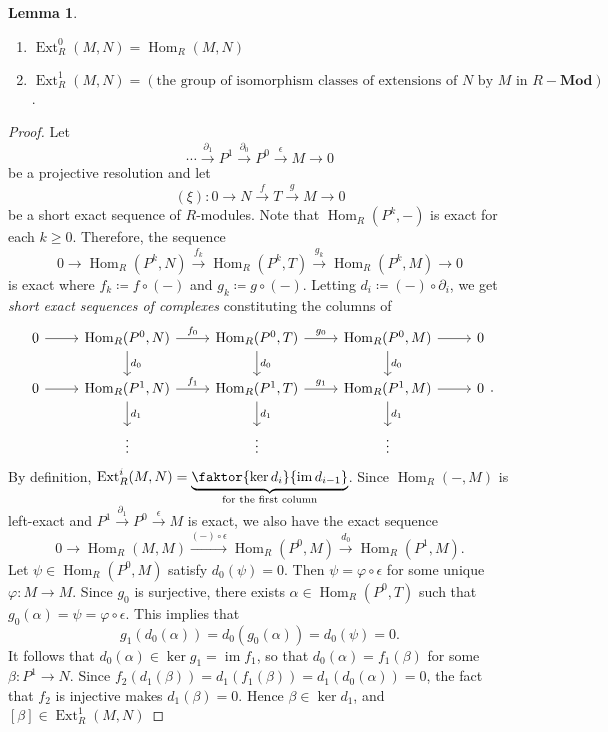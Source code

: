 \documentclass[10pt,letterpaper,cm]{nupset}
\theoremstyle{definition}
\theoremstyle{theorem}
\newtheorem{lemma}[definition]{Lemma}
\theoremstyle{remark}
\newcommand{\1}{\mathbf{1}}
\newcommand{\0}{\vec 0}
\DeclareMathOperator{\ext}{Ext}
\DeclareMathOperator{\im}{im}
\DeclareMathOperator{\Hom}{Hom}
\begin{document}
\begin{lemma} $ $
\begin{enumerate}
\item $\ext^0_R(M, N) = \Hom_R(M, N)$
\item $\ext^1_R(M, N) = \left( \text{the group of isomorphism classes of extensions of } N \text{ by } M\text{ in } R{-}\mathbf{Mod}    \right)$.
\end{enumerate}                                                                                                \end{lemma}
\begin{proof}
Let $$\cdots \overset{\partial_1}{\longrightarrow} P^1 \overset{\partial_0}{\longrightarrow} P^0  \overset{\epsilon}{\longrightarrow} M \to 0$$ be a projective resolution and
let $$(\xi) : 0 \to N \overset{f}{\longrightarrow} T \overset{g}{\longrightarrow} M \to 0$$ be a short exact sequence of $R$-modules.
Note that $\Hom_R(P^k, -)$ is exact for each $k\geq 0$. Therefore, the sequence $$ 0 \to \Hom_R(P^k, N) \overset{f_k}{\longrightarrow} \Hom_R(P^k, T) \overset{g_k}{\longrightarrow} \Hom_R(P^k, M) \to 0   $$ is exact where $f_k \coloneqq  f\circ (-)$ and $g_k \coloneqq  g \circ (-)$. Letting $d_i \coloneqq  (-)\circ \partial_i$, we get \textit{short exact sequences of complexes} constituting the columns of 
\[
\begin{tikzcd}
0 \arrow[r] & {\Hom_R(P^0, N)} \arrow[r, "f_0"] \arrow[d, "d_0"] & {\Hom_R(P^0, T)} \arrow[r, "g_0"] \arrow[d, "d_0"] & {\Hom_R(P^0, M)} \arrow[r] \arrow[d, "d_0"] & 0 \\
0 \arrow[r] & {\Hom_R(P^1, N)} \arrow[r, "f_1"] \arrow[d, "d_1"] & {\Hom_R(P^1, T)} \arrow[r, "g_1"] \arrow[d, "d_1"] & {\Hom_R(P^1, M)} \arrow[r] \arrow[d, "d_1"] & 0 \\
 & \vdots & \vdots & \vdots & 
\end{tikzcd}
.\]
By definition, $\ext_R^i(M, N) = \underbrace{\faktor{\ker{d_i}}{\im{d_{i-1}}}}_{\text{for the first column}}$. Since $\Hom_R(-, M)$ is left-exact and $P^1 \overset{\partial_1}{\longrightarrow} P^0 \overset{\epsilon}{\longrightarrow} M$ is exact, we also have the exact sequence $$ 0 \to \Hom_R(M, M) \overset{(-) \circ \epsilon}{\longrightarrow} \Hom_R(P^0, M) \overset{d_0}{\longrightarrow} \Hom_R(P^1, M) .  $$ 
Let $\psi \in \Hom_R(P^0, M)$ satisfy $d_0(\psi) =0$. Then $\psi = \varphi \circ \epsilon$ for some unique $\varphi : M\to M$. Since $g_0$ is surjective, there exists $\alpha \in \Hom_R(P^0, T)$ such that $g_0(\alpha) = \psi = \varphi \circ \epsilon $. This implies that $$g_1(d_0(\alpha)) = d_0(g_0(\alpha)) = d_0(\psi) =0.$$ It follows that $d_0(\alpha) \in \ker{g_1} = \im{f_1}$, so that $d_0(\alpha) = f_1(\beta)$ for some $\beta : P^1 \to N$. Since $f_2(d_1(\beta))=d_1(f_1(\beta))= d_1(d_0(\alpha)) = 0$, the fact that $f_2$ is injective makes $d_1(\beta) =0$. Hence $\beta \in \ker{d_1}$, and $[\beta] \in \ext^1_R(M, N)$ 

\end{proof}
\end{document}
